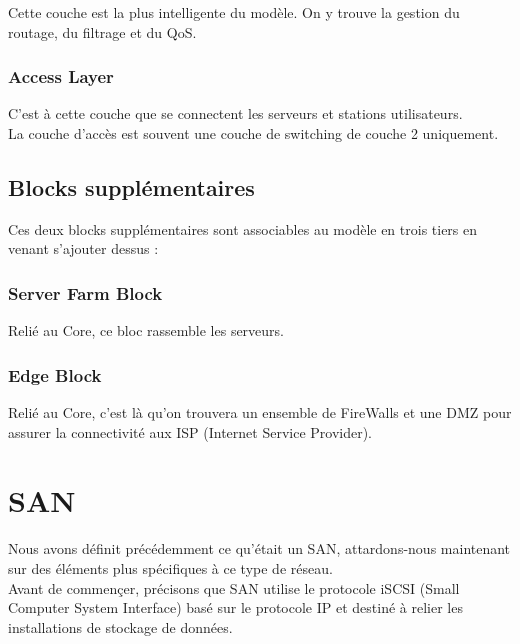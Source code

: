 \documentclass{report}
\begin{document}
				Cette couche est la plus intelligente du modèle. On y trouve la gestion du routage, du filtrage et du QoS.\\

			\subsubsection{Access Layer}

				C'est à cette couche que se connectent les serveurs et stations utilisateurs.\\
				La couche d'accès est souvent une couche de switching de couche 2 uniquement.\\

		\subsection{Blocks supplémentaires}

			Ces deux blocks supplémentaires sont associables au modèle en trois tiers en venant s'ajouter dessus : \\

			\subsubsection{Server Farm Block}

				Relié au Core, ce bloc rassemble les serveurs.\\

			\subsubsection{Edge Block}

				Relié au Core, c'est là qu'on trouvera un ensemble de FireWalls et une DMZ pour assurer la connectivité aux ISP (Internet Service Provider).\\

	\section{SAN}

		Nous avons définit précédemment ce qu'était un SAN, attardons-nous maintenant sur des éléments plus spécifiques à ce type de réseau.\\

		Avant de commençer, précisons que SAN utilise le protocole iSCSI (Small Computer System Interface) basé sur le protocole IP et destiné à relier les installations de stockage de données.\\
\end{document}
